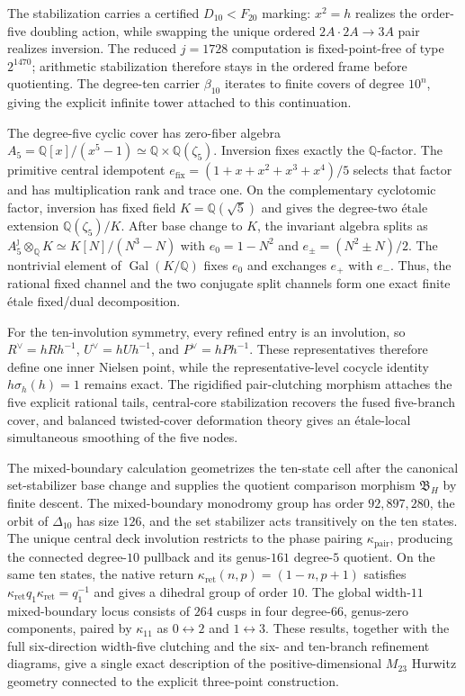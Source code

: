 \documentclass[11pt]{article}
\theoremstyle{remark}
\newcommand{\Q}{\mathbb Q}
\newcommand{\Gal}{\operatorname{Gal}}
\begin{document}
The stabilization carries a certified $D_{10}<F_{20}$ marking: $x^2=h$ realizes the order-five doubling action, while swapping the unique ordered $2A\cdot2A\to3A$ pair realizes inversion.  The reduced $j=1728$ computation is fixed-point-free of type $2^{1470}$; arithmetic stabilization therefore stays in the ordered frame before quotienting.  The degree-ten carrier $\beta_{10}$ iterates to finite covers of degree $10^n$, giving the explicit infinite tower attached to this continuation.

The degree-five cyclic cover has zero-fiber algebra $A_5=\Q[x]/(x^5-1)\simeq\Q\times\Q(\zeta_5)$.  Inversion fixes exactly the $\Q$-factor.  The primitive central idempotent $e_{\mathrm{fix}}=(1+x+x^2+x^3+x^4)/5$ selects that factor and has multiplication rank and trace one.  On the complementary cyclotomic factor, inversion has fixed field $K=\Q(\sqrt5)$ and gives the degree-two \'etale extension $\Q(\zeta_5)/K$.  After base change to $K$, the invariant algebra splits as $A_5^{\jmath}\otimes_{\Q}K\simeq K[N]/(N^3-N)$ with $e_0=1-N^2$ and $e_\pm=(N^2\pm N)/2$.  The nontrivial element of $\Gal(K/\Q)$ fixes $e_0$ and exchanges $e_+$ with $e_-$.  Thus, the rational fixed channel and the two conjugate split channels form one exact finite \'etale fixed/dual decomposition.

For the ten-involution symmetry, every refined entry is an involution, so $R^\vee=hRh^{-1}$, $U^\vee=hUh^{-1}$, and $P^\vee=hPh^{-1}$.  These representatives therefore define one inner Nielsen point, while the representative-level cocycle identity $h\sigma_h(h)=1$ remains exact.  The rigidified pair-clutching morphism attaches the five explicit rational tails, central-core stabilization recovers the fused five-branch cover, and balanced twisted-cover deformation theory gives an \'etale-local simultaneous smoothing of the five nodes.

The mixed-boundary calculation geometrizes the ten-state cell after the canonical set-stabilizer base change and supplies the quotient comparison morphism $\mathfrak B_H$ by finite descent.  The mixed-boundary monodromy group has order $92{,}897{,}280$, the orbit of $\Delta_{10}$ has size $126$, and the set stabilizer acts transitively on the ten states.  The unique central deck involution restricts to the phase pairing $\kappa_{\mathrm{pair}}$, producing the connected degree-$10$ pullback and its genus-$161$ degree-$5$ quotient.  On the same ten states, the native return $\kappa_{\mathrm{ret}}(n,p)=(1-n,p+1)$ satisfies $\kappa_{\mathrm{ret}}q_1\kappa_{\mathrm{ret}}=q_1^{-1}$ and gives a dihedral group of order $10$.  The global width-$11$ mixed-boundary locus consists of $264$ cusps in four degree-$66$, genus-zero components, paired by $\kappa_{11}$ as $0\leftrightarrow2$ and $1\leftrightarrow3$.  These results, together with the full six-direction width-five clutching and the six- and ten-branch refinement diagrams, give a single exact description of the positive-dimensional $M_{23}$ Hurwitz geometry connected to the explicit three-point construction.
\end{document}
